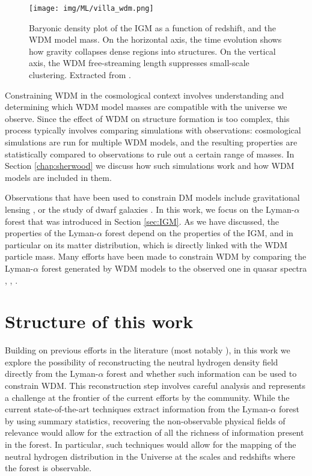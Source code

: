 \begin{figure}[ht]
    \centering
    \texttt{[image: img/ML/villa\_wdm.png]}
    \caption{Baryonic density plot of the IGM as a function of redshift, and the WDM model mass. On the horizontal axis, the time evolution shows how gravity collapses dense regions into structures. On the vertical axis, the WDM free-streaming length suppresses small-scale clustering. Extracted from \cite{Villasenor_2023}.}
    \label{fig:villasenor_wdm}
\end{figure}

Constraining WDM in the cosmological context involves understanding and determining which WDM model masses are compatible with the universe we observe. Since the effect of WDM on structure formation is too complex, this process typically involves comparing simulations with observations: cosmological simulations are run for multiple WDM models, and the resulting properties are statistically compared to observations to rule out a certain range of masses. In Section \ref{chap:sherwood} we discuss how such simulations work and how WDM models are included in them.

Observations that have been used to constrain DM models include gravitational lensing \cite{Massey_2010}, \cite{Villanueva_Domingo_2021} or the study of dwarf galaxies \cite{Calore_2018}. In this work, we focus on the Lyman-$\alpha$ forest that was introduced in Section \ref{sec:IGM}. As we have discussed, the properties of the Lyman-$\alpha$ forest depend on the properties of the IGM, and in particular on its matter distribution, which is directly linked with the WDM particle mass. Many efforts have been made to constrain WDM by comparing the Lyman-$\alpha$ forest generated by WDM models to the observed one in quasar spectra \cite{sherwood_wdm}, \cite{Villasenor_2023}, \cite{Viel_2005}.

\section{Structure of this work}
Building on previous efforts in the literature (most notably \cite{nasir2024deep}), in this work we explore the possibility of reconstructing the neutral hydrogen density field directly from the Lyman-$\alpha$ forest and whether such information can be used to constrain WDM. This reconstruction step involves careful analysis and represents a challenge at the frontier of the current efforts by the community. While the current state-of-the-art techniques extract information from the Lyman-$\alpha$ forest by using summary statistics, recovering the
non-observable physical fields of relevance would allow for the extraction of all the richness of information present in the forest. In particular, such techniques would allow for the mapping of the neutral hydrogen distribution in the Universe at the scales and redshifts where the forest is observable.

